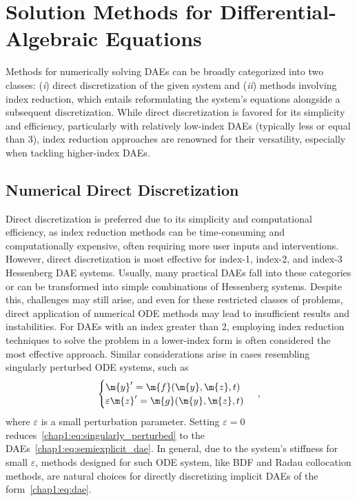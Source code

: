 
\section{Solution Methods for Differential-Algebraic Equations}

Methods for numerically solving \acp{DAE} can be broadly categorized into two classes: (\emph{i}) direct discretization of the given system and (\emph{ii}) methods involving index reduction, which entails reformulating the system's equations alongside a subsequent discretization. While direct discretization is favored for its simplicity and efficiency, particularly with relatively low-index \acp{DAE} (typically less or equal than 3), index reduction approaches are renowned for their versatility, especially when tackling higher-index \acp{DAE}.

\subsection{Numerical Direct Discretization}

Direct discretization is preferred due to its simplicity and computational efficiency, as index reduction methods can be time-consuming and computationally expensive, often requiring more user inputs and interventions. However, direct discretization is most effective for index-1, index-2, and index-3 Hessenberg \ac{DAE} systems. Usually, many practical \acp{DAE} fall into these categories or can be transformed into simple combinations of Hessenberg systems. Despite this, challenges may still arise, and even for these restricted classes of problems, direct application of numerical \ac{ODE} methods may lead to insufficient results and instabilities. For \acp{DAE} with an index greater than 2, employing index reduction techniques to solve the problem in a lower-index form is often considered the most effective approach. Similar considerations arise in cases resembling singularly perturbed \ac{ODE} systems, such as
%
\begin{equation}
  \begin{cases}
  \m{y}^{\prime} = \m{f}(\m{y}, \m{z}, t) \\
  \varepsilon \m{z}^{\prime} = \m{g}(\m{y}, \m{z}, t)
  \end{cases} \, \text{,}
  \label{chap1:eq:singularly_perturbed}
\end{equation}
%
where $\varepsilon$ is a small perturbation parameter. Setting $\varepsilon = 0$ reduces~\eqref{chap1:eq:singularly_perturbed} to the \acp{DAE}~\eqref{chap1:eq:semiexplicit_dae}. In general, due to the system's stiffness for small $\varepsilon$, methods designed for such \ac{ODE} system, like \ac{BDF} and Radau collocation methods, are natural choices for directly discretizing implicit \acp{DAE} of the form~\eqref{chap1:eq:dae}.


